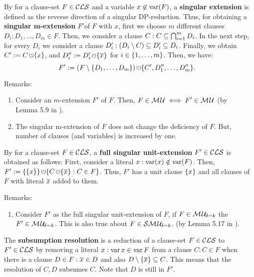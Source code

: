 \documentclass{article}
\begin{document}
\begin{defi}\label{def:singularextn}
By \cite{KullmannZhao2010Extremal} for a clause-set $F \in\mathcal{CLS}$ and a variable $x \not \in \operatorname{var}(F)$, a \textbf{singular extension} is defined as the reverse direction of a singular DP-reduction. Thus, for obtaining a \textbf{singular m-extension} $F' $of $F$ with $x$, first we choose $m$ different clauses $D_i:D_1, \dots, D_m \in F$. Then, we consider a clause  $C: C \subseteq \bigcap_{i=1}^m D_i$. In the next step, for every $D_i$ we consider a clause $D_i':(D_i \setminus C) \subseteq D_i' \subseteq D_i$. Finally, we obtain $C' := C \addcup \set{x}$, and $D_i'' := D_i' \addcup \set{\ol{x}}$ for $i \in \{ 1, \dots, m \}$. Then, we have:
  \begin{displaymath}
    F' := (F \sm \set{D_1,\dots,D_m}) \addcup \set{C', D_1'',\dots,D_m''}.
  \end{displaymath}
\end{defi}
Remarks:
  \begin{enumerate}
  \item Consider an $m$-extension $F'$ of $F$. Then, $F \in \mathcal{M\hspace{0.8pt}U} \iff F' \in \mathcal{M\hspace{0.8pt}U}$ (by Lemma 5.9 in \cite{KullmannZhao2010Extremal}).
  \item The singular m-extension of $F$ does not change the deficiency of $F$. But, number of clauses (and variables) is increased by one.
  \end{enumerate}
  
\begin{defi}\label{def:unit-ext}
By \cite{KullmannZhao2010Extremal} for a clause-set $F \in \mathcal{CLS}$, a \textbf{full singular unit-extension} $F' \in \mathcal{CLS}$ is obtained as follows: First, consider a literal $x:\operatorname{var}(x) \notin \operatorname{var}(F)$. Then, $F' := \set{\set{x}} \addcup \set{C \addcup \set{\ol{x}} : C \in F}$. Thus, $F' $ has a unit clause $\{ x \}$ and all clauses of $F$ with literal $\overline{x}$ added to them.
\end{defi}
Remarks:
  \begin{enumerate}
  \item Consider $F'$ as the full singular unit-extension of $F$, if $F \in \mathcal{M\hspace{0.8pt}U}_{\!\delta=k} $ the  $F' \in \mathcal{M\hspace{0.8pt}U}_{\!\delta=k} $. This is also true about $F \in \mathcal{S}\mathcal{M\hspace{0.8pt}U}_{\!\delta=k}$. (by Lemma 5.17 in \cite{KullmannZhao2010Extremal}).
  \end{enumerate}
  
  \begin{defi}\label{def:sres}
The \textbf{subsumption resolution} is a reduction of a clause-set $F \in \mathcal{CLS}$ to $F' \in \mathcal{CLS}$ by removing a literal $x : \operatorname{var}{x} \in \operatorname{var}{F}$ from a clause $C:C \in F$ when there is a clause $D \in F: \overline x \in D$ and also $D \setminus \{ \overline x \} \subseteq C$. This means that the resolution of $C,D$ subsumes $C$. Note that $D$ is still in $F'$.
\end{defi}
\end{document}
